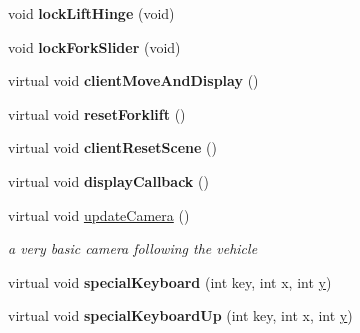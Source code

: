 \begin{DoxyCompactItemize}
\item 
\hypertarget{class_fork_lift_demo_aabc47ae6276322de4f9df966683199c8}{void {\bfseries lock\+Lift\+Hinge} (void)}\label{class_fork_lift_demo_aabc47ae6276322de4f9df966683199c8}

\item 
\hypertarget{class_fork_lift_demo_ac490782a51a8cbcd1d100f4f115c8c33}{void {\bfseries lock\+Fork\+Slider} (void)}\label{class_fork_lift_demo_ac490782a51a8cbcd1d100f4f115c8c33}

\item 
\hypertarget{class_fork_lift_demo_ab69f530f3b77923148787b7ca3c1426c}{virtual void {\bfseries client\+Move\+And\+Display} ()}\label{class_fork_lift_demo_ab69f530f3b77923148787b7ca3c1426c}

\item 
\hypertarget{class_fork_lift_demo_aed55d4ec0fa55b760eb3cf5adefce54d}{virtual void {\bfseries reset\+Forklift} ()}\label{class_fork_lift_demo_aed55d4ec0fa55b760eb3cf5adefce54d}

\item 
\hypertarget{class_fork_lift_demo_a567710c4a13238736b8fe5009536e573}{virtual void {\bfseries client\+Reset\+Scene} ()}\label{class_fork_lift_demo_a567710c4a13238736b8fe5009536e573}

\item 
\hypertarget{class_fork_lift_demo_ad085fe393385fa1d91b498e64a508b08}{virtual void {\bfseries display\+Callback} ()}\label{class_fork_lift_demo_ad085fe393385fa1d91b498e64a508b08}

\item 
\hypertarget{class_fork_lift_demo_a79815ce7e18829c5d4229de07d43df5d}{virtual void \hyperlink{class_fork_lift_demo_a79815ce7e18829c5d4229de07d43df5d}{update\+Camera} ()}\label{class_fork_lift_demo_a79815ce7e18829c5d4229de07d43df5d}

\begin{DoxyCompactList}\small\item\em a very basic camera following the vehicle \end{DoxyCompactList}\item 
\hypertarget{class_fork_lift_demo_ae6a3108fb6aa551e131ae25b3d47192c}{virtual void {\bfseries special\+Keyboard} (int key, int x, int \hyperlink{_ice_utils_8h_aa7ffaed69623192258fb8679569ff9ba}{y})}\label{class_fork_lift_demo_ae6a3108fb6aa551e131ae25b3d47192c}

\item 
\hypertarget{class_fork_lift_demo_ab0e5ade3aa8046a24600440bfbfc4ee5}{virtual void {\bfseries special\+Keyboard\+Up} (int key, int x, int \hyperlink{_ice_utils_8h_aa7ffaed69623192258fb8679569ff9ba}{y})}\label{class_fork_lift_demo_ab0e5ade3aa8046a24600440bfbfc4ee5}


\end{DoxyCompactItemize}
